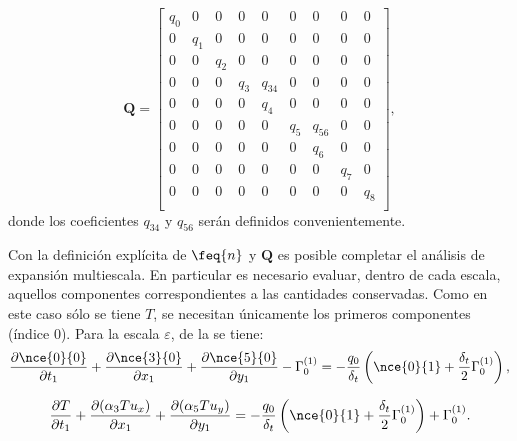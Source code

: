 \begin{equation}
	\bm{Q}=
	\begin{bmatrix}
	q_0 & 0 & 0 & 0 & 0 & 0 & 0 & 0 & 0 \\
	0 & q_1 & 0 & 0 & 0 & 0 & 0 & 0 & 0 \\
	0 & 0 & q_2 & 0 & 0 & 0 & 0 & 0 & 0 \\
	0 & 0 & 0 & q_3 & q_{34} & 0 & 0 & 0 & 0 \\
	0 & 0 & 0 & 0 & q_4 & 0 & 0 & 0 & 0 \\
	0 & 0 & 0 & 0 & 0 & q_5 & q_{56} & 0 & 0 \\
	0 & 0 & 0 & 0 & 0 & 0 & q_6 & 0 & 0 \\
	0 & 0 & 0 & 0 & 0 & 0 & 0 & q_7 & 0 \\
	0 & 0 & 0 & 0 & 0 & 0 & 0 & 0 & q_8 \\
	\end{bmatrix},
\end{equation} 
donde los coeficientes $q_{34}$ y $q_{56}$ ser\'an definidos convenientemente.  

Con la definici\'on expl\'icita de $\feq{n}$ y $\bm{Q}$ es posible completar el an\'alisis de expansi\'on multiescala. En particular es necesario evaluar, dentro de cada escala, aquellos componentes correspondientes a las cantidades conservadas. Como en este caso s\'olo se tiene $T$, se necesitan \'unicamente los primeros componentes (\'indice 0). Para la escala $\varepsilon$, de la  se tiene:
\begin{equation}
	\dfrac{ \partial \nce{0}{0}}{\partial t_1}  +  \dfrac{ \partial \nce{3}{0}}{\partial x_1} + \dfrac{ \partial \nce{5}{0}}{\partial y_1} - \Gamma_0^{(1)}= -\dfrac{q_0}{\delta_t} \left( \nce{0}{1} + \dfrac{\delta_t}{2} \Gamma_0^{(1)} \right),
\end{equation}

\begin{equation}
	\dfrac{ \partial T}{\partial t_1}  +  \dfrac{ \partial (\alpha_3 T u_x)}{\partial x_1} + \dfrac{ \partial (\alpha_5 T u_y)}{\partial y_1} = -\dfrac{q_0}{\delta_t} \left( \nce{0}{1} + \dfrac{\delta_t}{2} \Gamma_0^{(1)} \right) + \Gamma_0^{(1)}.
	\label{eq:T_eps_1}
\end{equation}

